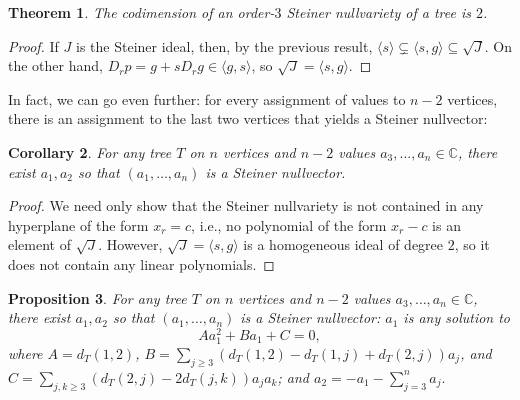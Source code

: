 \documentclass{article}
\newtheorem{theorem}{Theorem}[section]
\newtheorem{prop}[theorem]{Proposition}
\newtheorem{cor}[theorem]{Corollary}
\begin{document}
\begin{theorem}
The codimension of an order-$3$ Steiner nullvariety of a tree is $2$.
\end{theorem}
\begin{proof}
    If $J$ is the Steiner ideal, then, by the previous result, $\langle s \rangle \subsetneq \langle s,g \rangle \subseteq \sqrt{J}$.  On the other hand, $D_r p = g + s D_r g \in \langle g,s \rangle$, so $\sqrt{J} = \langle s,g \rangle$.
\end{proof}

In fact, we can go even further: for every assignment of values to $n-2$ vertices, there is an assignment to the last two vertices that yields a Steiner nullvector:

\begin{cor} For any tree $T$ on $n$ vertices and $n-2$ values $a_3,\ldots,a_{n} \in \mathbb{C}$, there exist $a_1,a_2$ so that $(a_1,\ldots,a_n)$ is a Steiner nullvector. 
\end{cor}
\begin{proof}
    We need only show that the Steiner nullvariety is not contained in any hyperplane of the form $x_r = c$, i.e., no polynomial of the form $x_r - c$ is an element of $\sqrt{J}$.  However, $\sqrt{J} = \langle s,g \rangle$ is a homogeneous ideal of degree $2$, so it does not contain any linear polynomials.
\end{proof}


\begin{prop}
For any tree $T$ on $n$ vertices and $n-2$ values $a_3,\ldots,a_{n} \in \mathbb{C}$, there exist $a_1,a_2$ so that $(a_1,\ldots,a_n)$ is a Steiner nullvector: $a_1$ is any solution to
$$
    A a_1^2 + B a_1 + C = 0,
$$ 
where $A = d_T(1,2)$, $B = \sum_{j \geq 3} (d_T(1,2)-d_T(1,j)+d_T(2,j))a_j$, and $C = \sum_{j,k \geq 3} (d_T(2,j) - 2d_T(j,k)) a_j a_k$; and $a_2 = -a_1 -\sum_{j=3}^na_j.$
\end{prop}
\end{document}
